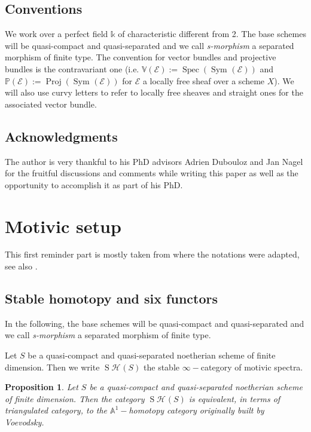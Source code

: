 \documentclass{amsart}
\theoremstyle{plain}%
\newtheorem{prop}[subsubsection]{Proposition}
\theoremstyle{remark}
\theoremstyle{definition}
\newcommand{\cE}{\mathcal{E}}
\newcommand{\cH}{\mathcal{H}}
\newcommand{\eA}{\mathbb{A}}
\newcommand{\ek}{\mathbb{k}}
\newcommand{\eP}{\mathbb{P}}
\newcommand{\eV}{\mathbb{V}}
\newcommand{\Au}{{\eA^1}}
\newcommand{\StableHo}[2][]{\operatorname{S}\!\cH^{#1}\!\left(#2\right)}
\newcommand{\Spec}[1]{\operatorname{Spec}\left(#1\right)}
\newcommand{\Proj}[1]{\operatorname{Proj}\left(#1\right)}
\newcommand{\Symalg}[2][]{\operatorname{Sym}^{#1}\left(#2\right)}
\begin{document}
\subsection*{Conventions}

We work over a perfect field $\ek$ of characteristic different from 2. The base schemes will be quasi-compact and quasi-separated and we call \emph{s-morphism} a separated morphism of finite type. The convention for vector bundles and projective bundles is the contravariant one (i.e. $\eV(\cE) := \Spec{\Symalg{\cE}}$ and $\eP(\cE) := \Proj{\Symalg{\cE}}$ for $\cE$ a locally free sheaf over a scheme $X$). We will also use curvy letters to refer to locally free sheaves and straight ones for the associated vector bundle.

\subsection*{Acknowledgments}
The author is very thankful to his PhD advisors Adrien Dubouloz and Jan Nagel for the fruitful discussions and comments while writing this paper as well as the opportunity to accomplish it as part of his PhD.







\section{Motivic setup}\label{SEC - motivic setup}

This first reminder part is mostly taken from \cite{DJK21} where the notations were adapted, see also \cite{Cha_dP2-4}.

\subsection{Stable homotopy and six functors}\label{SSEC - homotopie stable et six foncteurs}

In the following, the base schemes will be quasi-compact and quasi-separated and we call \emph{s-morphism} a separated morphism of finite type.

Let $S$ be a quasi-compact and quasi-separated noetherian scheme of finite dimension. Then we write $\StableHo{S}$ the stable $\infty-$category of motivic spectra.


\begin{prop}
Let $S$ be a quasi-compact and quasi-separated noetherian scheme of finite dimension. Then the category $\StableHo{S}$ is equivalent, in terms of triangulated category, to the $\Au-$homotopy category originally built by Voevodsky.
\end{prop}
\end{document}
